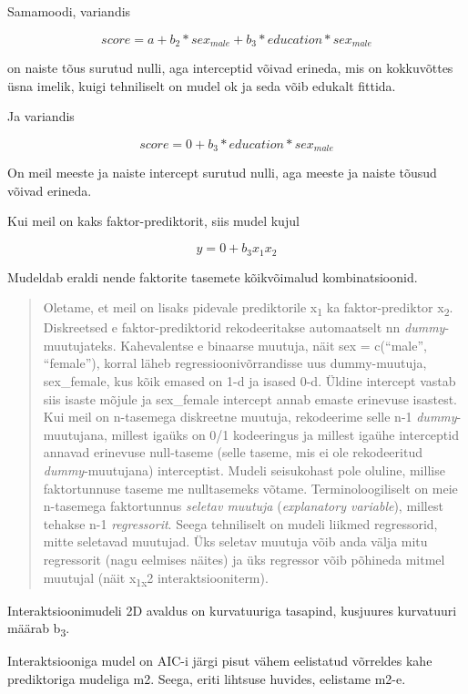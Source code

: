 \documentclass[]{book}
\begin{document}
Samamoodi, variandis

\[score = a +  b_2 * sex_{male} + b_3 * education * sex_{male}\]

on naiste tõus surutud nulli, aga interceptid võivad erineda, mis on
kokkuvõttes üsna imelik, kuigi tehniliselt on mudel ok ja seda võib
edukalt fittida.

Ja variandis

\[score = 0 + b_3 * education * sex_{male}\]

On meil meeste ja naiste intercept surutud nulli, aga meeste ja naiste
tõusud võivad erineda.

Kui meil on kaks faktor-prediktorit, siis mudel kujul

\[y= 0 + b_3x_1x_2\]

Mudeldab eraldi nende faktorite tasemete kõikvõimalud kombinatsioonid.

\begin{quote}
Oletame, et meil on lisaks pidevale prediktorile x\textsubscript{1} ka
faktor-prediktor x\textsubscript{2}. Diskreetsed e faktor-prediktorid
rekodeeritakse automaatselt nn \emph{dummy}-muutujateks. Kahevalentse e
binaarse muutuja, näit sex = c(``male'', ``female''), korral läheb
regressioonivõrrandisse uus dummy-muutuja, sex\_female, kus kõik emased
on 1-d ja isased 0-d. Üldine intercept vastab siis isaste mõjule ja
sex\_female intercept annab emaste erinevuse isastest. Kui meil on
n-tasemega diskreetne muutuja, rekodeerime selle n-1
\emph{dummy}-muutujana, millest igaüks on 0/1 kodeeringus ja millest
igaühe interceptid annavad erinevuse null-taseme (selle taseme, mis ei
ole rekodeeritud \emph{dummy}-muutujana) interceptist. Mudeli
seisukohast pole oluline, millise faktortunnuse taseme me nulltasemeks
võtame. Terminoloogiliselt on meie n-tasemega faktortunnus \emph{seletav
muutuja} (\emph{explanatory variable}), millest tehakse n-1
\emph{regressorit}. Seega tehniliselt on mudeli liikmed regressorid,
mitte seletavad muutujad. Üks seletav muutuja võib anda välja mitu
regressorit (nagu eelmises näites) ja üks regressor võib põhineda mitmel
muutujal (näit x\textsubscript{1x}2 interaktsiooniterm).
\end{quote}

Interaktsioonimudeli 2D avaldus on kurvatuuriga tasapind, kusjuures
kurvatuuri määrab b\textsubscript{3}.

Interaktsiooniga mudel on AIC-i järgi pisut vähem eelistatud võrreldes
kahe prediktoriga mudeliga m2. Seega, eriti lihtsuse huvides, eelistame
m2-e.
\end{document}
